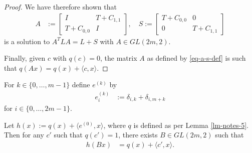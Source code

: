 \begin{proof}
We have therefore shown that
\begin{align}
A
&:=
\left[
\begin{array}{cc}
I & T + C_{1,1}
\\
T + C_{0,0} & I
\end{array}
\right],
\quad
S
:=
\left[
\begin{array}{cc}
T + C_{0,0} & 0
\\
0 & T + C_{1,1}
\end{array}
\right]
\label{eq-a-s-def}
\end{align}
is a solution to $A^T L A = L + S$ with $A \in GL(2 m, 2)$.

Finally, given $c$ with $q(c)=0$, the matrix $A$ as defined by \eqref{eq-a-s-def} is such that
$q(A x) = q(x) + \langle c, x \rangle$.
\end{proof}

\begin{Lemma}
\label{lm-notes-6}
For $k \in \{0,\ldots,m-1\}$ define $e^{(k)}$ by
\begin{align}
e_i^{(k)} &:= \delta_{i,k} + \delta_{i,m+k}
\label{eq-e-def}
\end{align}
for $i \in \{0,\ldots,2 m - 1\}$.

Let $h(x) := q(x) + \langle e^{(0)}, x \rangle$, where $q$ is defined as per Lemma \ref{lm-notes-5}.
Then for any $c'$ such that $q(c')=1$, there exists $B \in GL(2 m, 2)$ such that
\begin{align}
h(B x) &= q(x) + \langle c',x \rangle.
\label{eq-h-B-x}
\end{align}
\end{Lemma}

